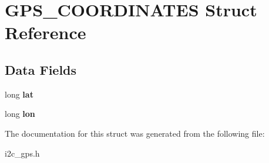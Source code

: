 \hypertarget{struct_g_p_s___c_o_o_r_d_i_n_a_t_e_s}{\section{G\-P\-S\-\_\-\-C\-O\-O\-R\-D\-I\-N\-A\-T\-E\-S Struct Reference}
\label{struct_g_p_s___c_o_o_r_d_i_n_a_t_e_s}
}
\subsection*{Data Fields}
\begin{DoxyCompactItemize}
\item 
\hypertarget{struct_g_p_s___c_o_o_r_d_i_n_a_t_e_s_a2db5f66dfd51284bea60feca7d6e9a8a}{long {\bfseries lat}}\label{struct_g_p_s___c_o_o_r_d_i_n_a_t_e_s_a2db5f66dfd51284bea60feca7d6e9a8a}

\item 
\hypertarget{struct_g_p_s___c_o_o_r_d_i_n_a_t_e_s_af531cc7ba5970d739586dc307c02d6bd}{long {\bfseries lon}}\label{struct_g_p_s___c_o_o_r_d_i_n_a_t_e_s_af531cc7ba5970d739586dc307c02d6bd}

\end{DoxyCompactItemize}


The documentation for this struct was generated from the following file\-:\begin{DoxyCompactItemize}
\item 
i2c\-\_\-gps.\-h\end{DoxyCompactItemize}
